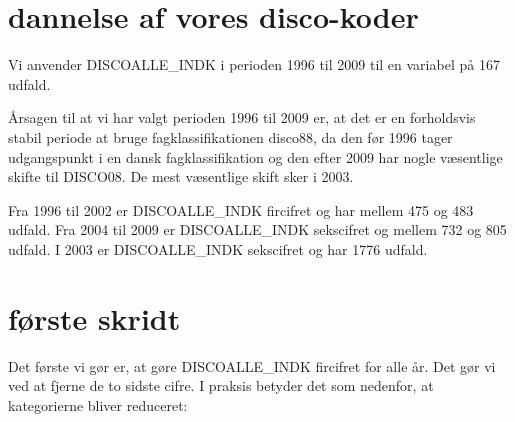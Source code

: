 \section{dannelse af vores disco-koder \label{}}



Vi anvender DISCOALLE\_INDK i perioden 1996 til 2009 til en variabel på 167 udfald.

Årsagen til at vi har valgt perioden 1996 til 2009 er, at det er en forholdsvis stabil periode at bruge fagklassifikationen disco88, da den før 1996 tager udgangspunkt i en dansk fagklassifikation og den efter 2009 har nogle væsentlige skifte til DISCO08. De mest væsentlige skift sker i 2003.

Fra 1996 til 2002 er DISCOALLE\_INDK fircifret og har mellem 475 og 483 udfald. Fra 2004 til 2009 er DISCOALLE\_INDK sekscifret og mellem 732 og 805 udfald. I 2003 er DISCOALLE\_INDK sekscifret og har 1776 udfald.

\section{første skridt \label{}}

Det første vi gør er, at gøre DISCOALLE\_INDK fircifret for alle år. Det gør vi ved at fjerne de to sidste cifre. I praksis betyder det som nedenfor, at kategorierne bliver reduceret:


